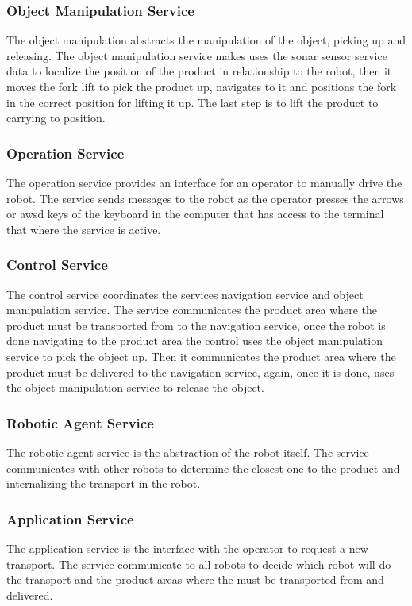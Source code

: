 \subsubsection*{Object Manipulation Service}
The object manipulation abstracts the manipulation of the object, picking up and releasing. The object manipulation service makes uses the sonar sensor service data to localize the position of the product in relationship to the robot, then it moves the fork lift to pick the product up, navigates to it and positions the fork in the correct position for lifting it up. The last step is to lift the product to carrying to position. 

\subsubsection*{Operation Service}
The operation service provides an interface for an operator to manually drive the robot. The service sends messages to the robot as the operator presses the arrows or awsd keys of the keyboard in the computer that has access to the terminal that where the service is active.

\subsubsection*{Control Service}
The control service coordinates the services navigation service and object manipulation service. The service communicates the product area where the product must be transported from to the navigation service, once the robot is done navigating to the product area the control uses the object manipulation service to pick the object up. Then it communicates the product area where the product must be delivered to the navigation service, again, once it is done, uses the object manipulation service to release the object.

\subsubsection*{Robotic Agent Service}
The robotic agent service is the abstraction of the robot itself. The service communicates with other robots to determine the closest one to the product and internalizing the transport in the robot.

\subsubsection*{Application Service}
The application service is the interface with the operator to request a new transport. The service communicate to all robots to decide which robot will do the transport and the product areas where the must be transported from and delivered. 

